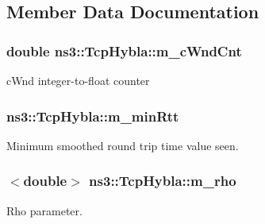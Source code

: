 \subsection{Member Data Documentation}
\subsubsection[{\texorpdfstring{m\+\_\+c\+Wnd\+Cnt}{m_cWndCnt}}]{\setlength{\rightskip}{0pt plus 5cm}double ns3\+::\+Tcp\+Hybla\+::m\+\_\+c\+Wnd\+Cnt\hspace{0.3cm}{\ttfamily [private]}}\hypertarget{classns3_1_1TcpHybla_ac5ab21faceb85b6e6038419fd8392d54}{}\label{classns3_1_1TcpHybla_ac5ab21faceb85b6e6038419fd8392d54}


c\+Wnd integer-\/to-\/float counter 

\subsubsection[{\texorpdfstring{m\+\_\+min\+Rtt}{m_minRtt}}]{ ns3\+::\+Tcp\+Hybla\+::m\+\_\+min\+Rtt\hspace{0.3cm}{\ttfamily [private]}}\hypertarget{classns3_1_1TcpHybla_aba2994395c9fa371e2a1cd84b713a157}{}\label{classns3_1_1TcpHybla_aba2994395c9fa371e2a1cd84b713a157}


Minimum smoothed round trip time value seen. 

\subsubsection[{\texorpdfstring{m\+\_\+rho}{m_rho}}]{$<$double$>$ ns3\+::\+Tcp\+Hybla\+::m\+\_\+rho\hspace{0.3cm}{\ttfamily [private]}}\hypertarget{classns3_1_1TcpHybla_a89505ef8588ef3cbe7d19422cd8e1c78}{}\label{classns3_1_1TcpHybla_a89505ef8588ef3cbe7d19422cd8e1c78}


Rho parameter. 

